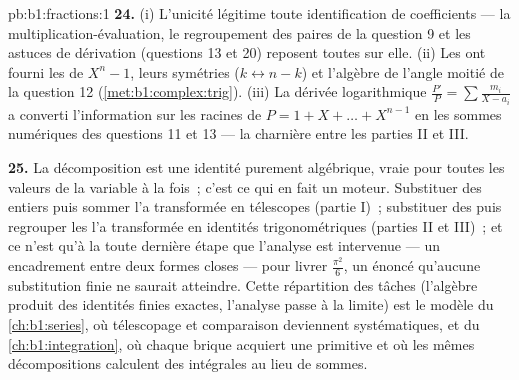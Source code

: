 \begin{solution}{pb:b1:fractions:1}
\textbf{24.} (i) L'unicité légitime toute identification de
coefficients --- la multiplication-évaluation, le regroupement des
paires  de la question 9 et les astuces de dérivation
(questions 13 et 20) reposent toutes sur elle. (ii) Les  ont fourni les  de $X^n - 1$, leurs symétries ($k
\leftrightarrow n-k$) et l'algèbre de l'angle moitié de la question 12
(\cref{met:b1:complex:trig}). (iii) La dérivée logarithmique
$\frac{P'}P = \sum\frac{m_i}{X-a_i}$ a converti l'information sur les
racines de $P = 1 + X + \dots + X^{n-1}$ en les sommes numériques des
questions 11 et 13 --- la charnière entre les parties II et III.

\textbf{25.} La décomposition est une identité purement algébrique,
vraie pour toutes les valeurs de la variable à la fois~; c'est ce qui en
fait un moteur. Substituer des entiers puis sommer l'a transformée en
télescopes (partie I)~; substituer des  puis regrouper
les  l'a transformée en identités trigonométriques (parties II
et III)~; et ce n'est qu'à la toute dernière étape que l'analyse est
intervenue --- un encadrement entre deux formes closes --- pour livrer
$\frac{\pi^2}6$, un énoncé qu'aucune substitution finie ne saurait
atteindre. Cette répartition des tâches (l'algèbre produit des identités
finies exactes, l'analyse passe à la limite) est le modèle du
\cref{ch:b1:series}, où télescopage et comparaison deviennent
systématiques, et du \cref{ch:b1:integration}, où chaque brique acquiert
une primitive et où les mêmes décompositions calculent des intégrales au
lieu de sommes.
\end{solution}

